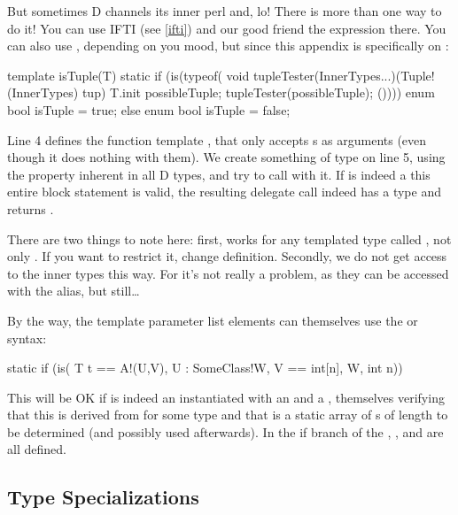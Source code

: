 But sometimes D channels its inner perl and, lo! There is more than one way to do it! You can use IFTI (see \ref{ifti}) and our good friend the \DD{(} expression there. You can also use , depending on you mood, but since this appendix is specifically on :

\begin{dcode}
template isTuple(T)
{
    static if (is(typeof({
              void tupleTester(InnerTypes...)(Tuple!(InnerTypes) tup) {}
              T.init possibleTuple;
              tupleTester(possibleTuple);
              }())))
        enum bool isTuple = true;
    else
        enum bool isTuple = false;
}
\end{dcode}

Line 4 defines the function template , that only accepts s as arguments (even though it does nothing with them). We create something of type  on line 5, using the  property inherent in all D types, and try to call  with it. If  is indeed a  this entire block statement is valid, the resulting delegate call indeed has a type and  returns .

There are two things to note here: first,  works for any templated type called , not only . If you want to restrict it, change  definition. Secondly, we do not get access to the inner types this way. For  it's not really a problem, as they can be accessed with the  alias, but still\ldots

By the way, the template parameter list elements can themselves use the  or  syntax:

\begin{dcode}
static if (is( T t == A!(U,V), U : SomeClass!W, V == int[n], W, int n))
\end{dcode}

This will be OK if  is indeed an  instantiated with an  and a , themselves verifying that this  is derived from  for some  type and that  is a static array of s of length  to be determined (and possibly used afterwards). In the if branch of the  , ,  and  are all defined. 

\subsection{Type Specializations}\label{typespecializations}

